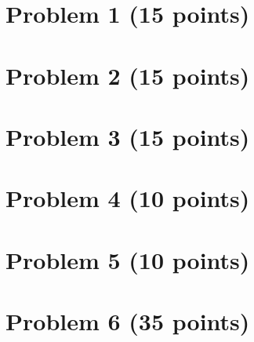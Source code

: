 \documentclass{article}
\begin{document}
\section*{Problem 1 (15 points)}
\section*{Problem 2 (15 points)}
\section*{Problem 3 (15 points)}
\section*{Problem 4 (10 points)}
\section*{Problem 5 (10 points)}
\section*{Problem 6 (35 points)}
\end{document}
